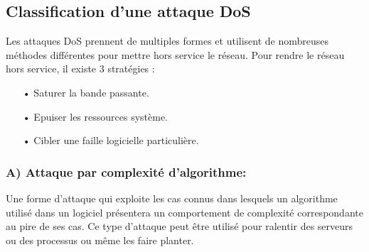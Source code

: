 \subsection{Classification d'une attaque DoS}
\label{rDoS}
Les attaques DoS prennent de multiples formes et utilisent de nombreuses méthodes différentes pour mettre hors service le réseau.
Pour rendre le réseau hors service, il existe 3 stratégies :\\
\begin{itemize}
\item[•]Saturer la bande passante.
\item[•]Epuiser les ressources système.
\item[•]Cibler une faille logicielle particulière.
\end{itemize} 

\subsubsection{A) Attaque par complexité d’algorithme:}
Une forme d’attaque qui exploite les cas connus dans lesquels un algorithme utilisé dans un logiciel présentera un comportement de complexité correspondante au pire de ses cas. Ce type d’attaque peut être utilisé pour ralentir des serveurs ou des processus ou même les faire planter. 

